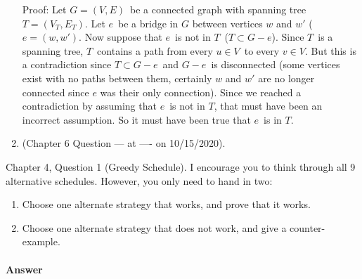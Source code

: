 \documentclass{article}
\begin{document}
\begin{enumerate}
        Proof: Let $G=(V,E)$ be a connected graph with spanning tree $T=(V_T,E_T)$.
        Let $e$ be a bridge in $G$ between vertices $w$ and $w'$ ($e = (w, w')$.
        Now suppose that $e$ is not in $T$ ($T \subset G - e$).
        Since $T$ is a spanning tree, $T$ contains a path from every $u \in V$ to every $v \in V$.
        But this is a contradiction since $T \subset G - e$ and $G - e$ is disconnected (some vertices exist with no paths between them, certainly $w$ and $w'$ are no longer connected since $e$ was their only connection).
        Since we reached a contradiction by assuming that $e$ is not in $T$, that must have been an incorrect assumption.
        So it must have been true that $e$ is in $T$.
    \item (Chapter 6 Question --- at ---- on 10/15/2020). \\
\end{enumerate}


\nextprob
{}

Chapter 4, Question 1 (Greedy Schedule).  I encourage you to think through all 9
alternative schedules.  However, you only need to hand in two:
\begin{enumerate}
    \item Choose one alternate strategy that
        works, and prove that it works.
    \item Choose one alternate strategy that does not work, and give a
        counter-example.
\end{enumerate}

\paragraph{Answer}
\end{document}
